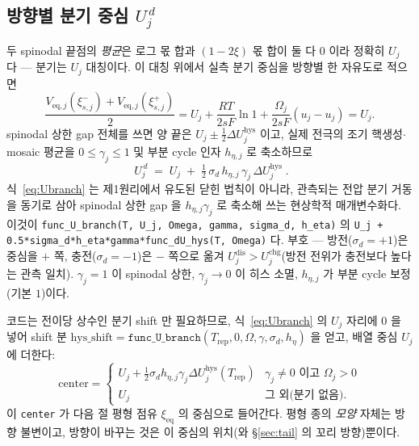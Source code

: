 \documentclass[11pt,a4paper]{article}
\newcommand{\eq}{\mathrm{eq}}
\newcommand{\dis}{\mathrm{dis}}
\newcommand{\chg}{\mathrm{chg}}
\newcommand{\hys}{\mathrm{hys}}
\newcommand{\rep}{\mathrm{rep}}
\newcommand{\code}[1]{\texttt{#1}}
\begin{document}
\subsection{방향별 분기 중심 $U_j^{\,d}$}
두 spinodal 끝점의 \emph{평균}은 로그 몫 합과 $(1-2\xi)$ 몫 합이 둘 다 $0$ 이라 정확히 $U_j$ 다 — 분기는 $U_j$
대칭이다. 이 대칭 위에서 실측 분기 중심을 방향별 한 자유도로 적으면
\begin{equation}
\frac{V_{\eq,j}(\xi_{s,j}^-)+V_{\eq,j}(\xi_{s,j}^+)}{2}
=U_j+\frac{RT}{2sF}\ln 1+\frac{\Omega_j}{2sF}(u_j-u_j)
=U_j.
\label{eq:Ubranchderive}
\end{equation}
spinodal 상한 gap 전체를 쓰면 양 끝은 $U_j\pm\tfrac12\Delta U_j^\hys$ 이고, 실제 전극의 조기 핵생성$\cdot$mosaic 평균을
$0\le\gamma_j\le1$ 및 부분 cycle 인자 $h_{\eta,j}$ 로 축소하므로
\begin{equation}
\boxed{\;U_j^{\,d}\;=\;U_j\;+\;\tfrac12\,\sigma_d\,h_{\eta,j}\,\gamma_j\,\Delta U_j^\hys\;.}
\label{eq:Ubranch}
\end{equation}
식~\eqref{eq:Ubranch} 는 제1원리에서 유도된 닫힌 법칙이 아니라, 관측되는 전압 분기 거동을 동기로 삼아 spinodal 상한
gap 을 $h_{\eta,j}\gamma_j$ 로 축소해 쓰는 현상학적 매개변수화다.
이것이 \code{func\_U\_branch(T, U\_j, Omega, gamma, sigma\_d, h\_eta)} 의
\code{U\_j + 0.5*sigma\_d*h\_eta*gamma*func\_dU\_hys(T, Omega)} 다. 부호 — 방전($\sigma_d=+1$)은 중심을 $+$ 쪽,
충전($\sigma_d=-1$)은 $-$ 쪽으로 옮겨 $U_j^{\dis}>U_j^{\chg}$(방전 전위가 충전보다 높다는 관측 일치). $\gamma_j=1$ 이
spinodal 상한, $\gamma_j\to0$ 이 히스 소멸, $h_{\eta,j}$ 가 부분 cycle 보정(기본 $1$)이다.

코드는 전이당 상수인 분기 shift 만 필요하므로, 식~\eqref{eq:Ubranch} 의 $U_j$ 자리에 $0$ 을 넣어 shift 분
$\mathrm{hys\_shift}=\code{func\_U\_branch}(T_\rep,0,\Omega,\gamma,\sigma_d,h_\eta)$ 을 얻고, 배열 중심 $U_j$ 에 더한다:
\begin{equation}
\mathrm{center}=
\begin{cases}
U_j+\tfrac12\sigma_d h_{\eta,j}\gamma_j\Delta U_j^\hys(T_\rep) & \gamma_j\ne0 \text{ 이고 } \Omega_j>0\\[2pt]
U_j & \text{그 외(분기 없음)}.
\end{cases}
\label{eq:center}
\end{equation}
이 \code{center} 가 다음 절 평형 점유 $\xi_\eq$ 의 중심으로 들어간다. 평형 종의 \emph{모양} 자체는 방향 불변이고,
방향이 바꾸는 것은 이 중심의 위치(와 \S\ref{sec:tail} 의 꼬리 방향)뿐이다.
\end{document}
